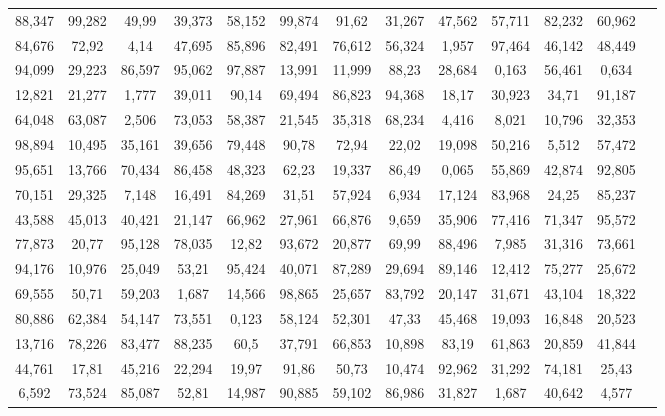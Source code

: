 \documentclass[border=0.5cm]{standalone}
\begin{document}
\begin{tabular}{SSSSSSSSSSSSS}
88,347	&	99,282	&	49,99	&	39,373	&	58,152	&	99,874	&	91,62	&	31,267	&	47,562	&	57,711	&	82,232	&	60,962	\\
84,676	&	72,92	&	4,14	&	47,695	&	85,896	&	82,491	&	76,612	&	56,324	&	1,957	&	97,464	&	46,142	&	48,449	\\
94,099	&	29,223	&	86,597	&	95,062	&	97,887	&	13,991	&	11,999	&	88,23	&	28,684	&	0,163	&	56,461	&	0,634	\\
12,821	&	21,277	&	1,777	&	39,011	&	90,14	&	69,494	&	86,823	&	94,368	&	18,17	&	30,923	&	34,71	&	91,187	\\
64,048	&	63,087	&	2,506	&	73,053	&	58,387	&	21,545	&	35,318	&	68,234	&	4,416	&	8,021	&	10,796	&	32,353	\\
98,894	&	10,495	&	35,161	&	39,656	&	79,448	&	90,78	&	72,94	&	22,02	&	19,098	&	50,216	&	5,512	&	57,472	\\
95,651	&	13,766	&	70,434	&	86,458	&	48,323	&	62,23	&	19,337	&	86,49	&	0,065	&	55,869	&	42,874	&	92,805	\\
70,151	&	29,325	&	7,148	&	16,491	&	84,269	&	31,51	&	57,924	&	6,934	&	17,124	&	83,968	&	24,25	&	85,237	\\
43,588	&	45,013	&	40,421	&	21,147	&	66,962	&	27,961	&	66,876	&	9,659	&	35,906	&	77,416	&	71,347	&	95,572	\\
77,873	&	20,77	&	95,128	&	78,035	&	12,82	&	93,672	&	20,877	&	69,99	&	88,496	&	7,985	&	31,316	&	73,661	\\
94,176	&	10,976	&	25,049	&	53,21	&	95,424	&	40,071	&	87,289	&	29,694	&	89,146	&	12,412	&	75,277	&	25,672	\\
69,555	&	50,71	&	59,203	&	1,687	&	14,566	&	98,865	&	25,657	&	83,792	&	20,147	&	31,671	&	43,104	&	18,322	\\
80,886	&	62,384	&	54,147	&	73,551	&	0,123	&	58,124	&	52,301	&	47,33	&	45,468	&	19,093	&	16,848	&	20,523	\\
13,716	&	78,226	&	83,477	&	88,235	&	60,5	&	37,791	&	66,853	&	10,898	&	83,19	&	61,863	&	20,859	&	41,844	\\
44,761	&	17,81	&	45,216	&	22,294	&	19,97	&	91,86	&	50,73	&	10,474	&	92,962	&	31,292	&	74,181	&	25,43	\\
6,592	&	73,524	&	85,087	&	52,81	&	14,987	&	90,885	&	59,102	&	86,986	&	31,827	&	1,687	&	40,642	&	4,577	\\ \bottomrule
\end{tabular}
\end{document}
